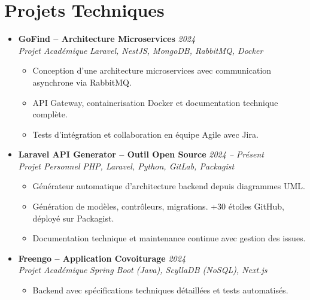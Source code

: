 \documentclass[a4paper,11pt]{article}
\begin{document}
\section{Projets Techniques}
\begin{itemize}[leftmargin=*, label={-}]

\item \textbf{GoFind -- Architecture Microservices} \hfill \textit{2024} \\
\textit{Projet Académique} \hfill \textit{Laravel, NestJS, MongoDB, RabbitMQ, Docker}
\vspace{-2pt}
    \begin{itemize}[leftmargin=0.4cm, nosep, label=\tiny$\bullet$]
        \item \small{Conception d'une architecture microservices avec communication asynchrone via RabbitMQ.}
        \item \small{API Gateway, containerisation Docker et documentation technique complète.}
        \item \small{Tests d'intégration et collaboration en équipe Agile avec Jira.}
    \end{itemize}
\vspace{3pt}

\item \textbf{Laravel API Generator -- Outil Open Source} \hfill \textit{2024 -- Présent} \\
\textit{Projet Personnel} \hfill \textit{PHP, Laravel, Python, GitLab, Packagist}
\vspace{-2pt}
    \begin{itemize}[leftmargin=0.4cm, nosep, label=\tiny$\bullet$]
        \item \small{Générateur automatique d'architecture backend depuis diagrammes UML.}
        \item \small{Génération de modèles, contrôleurs, migrations. +30 étoiles GitHub, déployé sur Packagist.}
        \item \small{Documentation technique et maintenance continue avec gestion des issues.}
    \end{itemize}
\vspace{3pt}

\item \textbf{Freengo -- Application Covoiturage} \hfill \textit{2024} \\
\textit{Projet Académique} \hfill \textit{Spring Boot (Java), ScyllaDB (NoSQL), Next.js}
\vspace{-2pt}
    \begin{itemize}[leftmargin=0.4cm, nosep, label=\tiny$\bullet$]
        \item \small{Backend avec spécifications techniques détaillées et tests automatisés.}
    \end{itemize}
\vspace{3pt}

\end{itemize}
\end{document}
